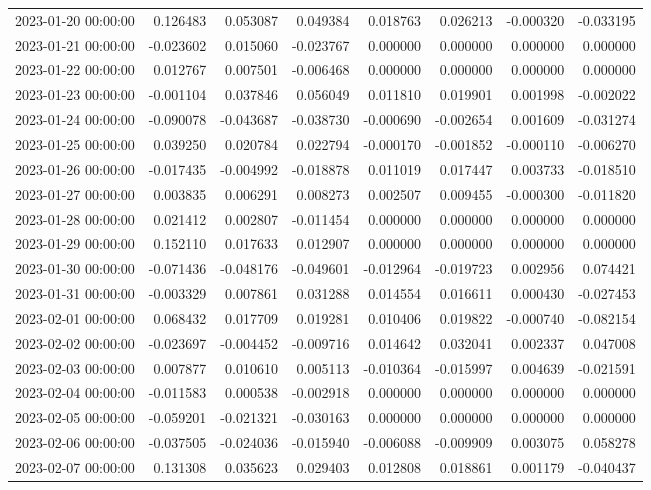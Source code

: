 \begin{tabular}{lrrrrrrr}
2023-01-20 00:00:00 & 0.126483 & 0.053087 & 0.049384 & 0.018763 & 0.026213 & -0.000320 & -0.033195 \\
2023-01-21 00:00:00 & -0.023602 & 0.015060 & -0.023767 & 0.000000 & 0.000000 & 0.000000 & 0.000000 \\
2023-01-22 00:00:00 & 0.012767 & 0.007501 & -0.006468 & 0.000000 & 0.000000 & 0.000000 & 0.000000 \\
2023-01-23 00:00:00 & -0.001104 & 0.037846 & 0.056049 & 0.011810 & 0.019901 & 0.001998 & -0.002022 \\
2023-01-24 00:00:00 & -0.090078 & -0.043687 & -0.038730 & -0.000690 & -0.002654 & 0.001609 & -0.031274 \\
2023-01-25 00:00:00 & 0.039250 & 0.020784 & 0.022794 & -0.000170 & -0.001852 & -0.000110 & -0.006270 \\
2023-01-26 00:00:00 & -0.017435 & -0.004992 & -0.018878 & 0.011019 & 0.017447 & 0.003733 & -0.018510 \\
2023-01-27 00:00:00 & 0.003835 & 0.006291 & 0.008273 & 0.002507 & 0.009455 & -0.000300 & -0.011820 \\
2023-01-28 00:00:00 & 0.021412 & 0.002807 & -0.011454 & 0.000000 & 0.000000 & 0.000000 & 0.000000 \\
2023-01-29 00:00:00 & 0.152110 & 0.017633 & 0.012907 & 0.000000 & 0.000000 & 0.000000 & 0.000000 \\
2023-01-30 00:00:00 & -0.071436 & -0.048176 & -0.049601 & -0.012964 & -0.019723 & 0.002956 & 0.074421 \\
2023-01-31 00:00:00 & -0.003329 & 0.007861 & 0.031288 & 0.014554 & 0.016611 & 0.000430 & -0.027453 \\
2023-02-01 00:00:00 & 0.068432 & 0.017709 & 0.019281 & 0.010406 & 0.019822 & -0.000740 & -0.082154 \\
2023-02-02 00:00:00 & -0.023697 & -0.004452 & -0.009716 & 0.014642 & 0.032041 & 0.002337 & 0.047008 \\
2023-02-03 00:00:00 & 0.007877 & 0.010610 & 0.005113 & -0.010364 & -0.015997 & 0.004639 & -0.021591 \\
2023-02-04 00:00:00 & -0.011583 & 0.000538 & -0.002918 & 0.000000 & 0.000000 & 0.000000 & 0.000000 \\
2023-02-05 00:00:00 & -0.059201 & -0.021321 & -0.030163 & 0.000000 & 0.000000 & 0.000000 & 0.000000 \\
2023-02-06 00:00:00 & -0.037505 & -0.024036 & -0.015940 & -0.006088 & -0.009909 & 0.003075 & 0.058278 \\
2023-02-07 00:00:00 & 0.131308 & 0.035623 & 0.029403 & 0.012808 & 0.018861 & 0.001179 & -0.040437 \\

\end{tabular}
